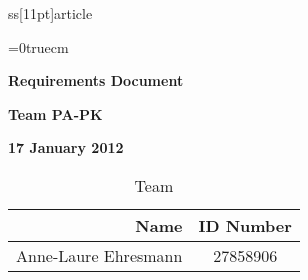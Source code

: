 ss[11pt]{article}
\usepackage{color}
\usepackage{enumitem}
\usepackage{booktabs}
\pagestyle{empty}
\setcounter{secnumdepth}{2}

\topmargin=0cm
\oddsidemargin=0cm
\textheight=22.0cm
\textwidth=17cm
\parindent=0cm
\parskip=0.15cm
\topskip=0truecm
\raggedbottom
\abovedisplayskip=3mm
\belowdisplayskip=3mm
\abovedisplayshortskip=0mm
\belowdisplayshortskip=2mm
\normalbaselineskip=12pt
\normalbaselines


\newcommand\tabularhead[1]{
\begin{table}[ht]
	\addtocounter{use case ID}{1}
	\caption{Use Case \arabic{use case ID} - #1}
	\vspace{0.2cm}
	\begin{tabular}{|p{0.2\linewidth}|p{0.70\linewidth}|}
	\hline
		\textbf{Action} & \textbf{#1} \\
		\hline}

	\newcommand\addrow[2]{#1 & #2\\ \hline}

	\newcommand\addmulrow[2]{ \begin{minipage}[t][][t]{2.5cm}#1\end{minipage}
		&\begin{minipage}[t][][t]{11cm}
		\begin{enumerate}[itemsep=-1ex] #2   \end{enumerate}
	\end{minipage}\\ \hline}

	\newenvironment{usecase}{\tabularhead}
{\hline\end{tabular}\end{table}}




\vspace*{0.5in}
\centerline{\bf\Large Requirements Document}

\vspace*{0.5in}
\centerline{\bf\Large Team PA-PK}

\vspace*{0.5in}
\centerline{\bf\Large 17 January 2012}

\vspace*{1.5in}
\begin{table}[htbp]
\caption{Team}
\begin{center}
\begin{tabular}{|r | c|}
\hline
Name & ID Number \\
\hline\hline
Anne-Laure Ehresmann & 27858906 \\
\hline
\end{tabular}
\end{center}
\end{table}

